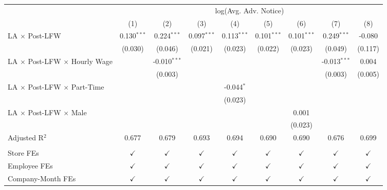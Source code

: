 
\begingroup
\centering
\scriptsize
\begin{tabular}{lcccccccc}
   \toprule
    & \multicolumn{8}{c}{log(Avg. Adv. Notice)}\\
                                               & (1)           & (2)            & (3)           & (4)           & (5)           & (6)           & (7)            & (8)\\  
   \midrule 
   LA $\times$ Post-LFW                        & 0.130$^{***}$ & 0.224$^{***}$  & 0.097$^{***}$ & 0.113$^{***}$ & 0.101$^{***}$ & 0.101$^{***}$ & 0.249$^{***}$  & -0.080\\   
                                               & (0.030)       & (0.046)        & (0.021)       & (0.023)       & (0.022)       & (0.023)       & (0.049)        & (0.117)\\   
   LA $\times$ Post-LFW $\times$ Hourly Wage   &               & -0.010$^{***}$ &               &               &               &               & -0.013$^{***}$ & 0.004\\   
                                               &               & (0.003)        &               &               &               &               & (0.003)        & (0.005)\\   
   LA $\times$ Post-LFW $\times$ Part-Time     &               &                &               & -0.044$^{*}$  &               &               &                &   \\   
                                               &               &                &               & (0.023)       &               &               &                &   \\   
   LA $\times$ Post-LFW $\times$ Male          &               &                &               &               &               & 0.001         &                &   \\   
                                               &               &                &               &               &               & (0.023)       &                &   \\   
   Adjusted R$^2$                              & 0.677         & 0.679          & 0.693         & 0.694         & 0.690         & 0.690         & 0.676          & 0.699\\  
    \\
   Store FEs                                   & $\checkmark$  & $\checkmark$   & $\checkmark$  & $\checkmark$  & $\checkmark$  & $\checkmark$  & $\checkmark$   & $\checkmark$\\   
   Employee FEs                                & $\checkmark$  & $\checkmark$   & $\checkmark$  & $\checkmark$  & $\checkmark$  & $\checkmark$  & $\checkmark$   & $\checkmark$\\   
   Company-Month FEs                           & $\checkmark$  & $\checkmark$   & $\checkmark$  & $\checkmark$  & $\checkmark$  & $\checkmark$  & $\checkmark$   & $\checkmark$\\   
   \bottomrule
\end{tabular}
\par\endgroup


